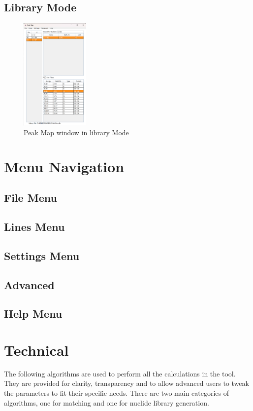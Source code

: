 \documentclass[12pt,report,justified]{SANDreport}
\begin{document}
\section{Library Mode}\label{sec:libMode}
\begin{figure}[h]
    \includegraphics[width=0.3\textwidth]{LibraryMode.png}
    \centering
    \caption{Peak Map window in library Mode}
    \label{fig:lib_mode}
\end{figure}
    \chapter{Menu Navigation}\label{sec:menu}
      \section{File Menu} \label{sec:file_menu}
      \section{Lines Menu} \label{sec:line_menu}
      \section{Settings Menu} \label{sec:set_menu}
      \section{Advanced} \label{sec:adv_menu}
      \section{Help Menu} \label{sec:help_menu}
    
    \chapter{Technical} \label{sec:tech}
The following algorithms are used to perform all the calculations in the tool. They are provided
for clarity, transparency and to allow advanced users to tweak the parameters to fit their specific
needs. There are two main categories of algorithms, one for matching and one for nuclide library
generation.
\end{document}
